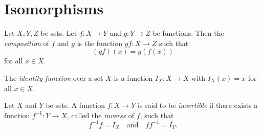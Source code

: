 \section{Isomorphisms}
\begin{definition}
  \label{def:composition}
  Let $X, Y, Z$ be sets.
  Let $f: X \to Y$ and $g: Y \to Z$ be functions.
  Then the \emph{composition} of $f$ and $g$ is the function $gf: X \to Z$ such
  that
  \begin{equation*}
    (gf)(x) = g(f(x))
  \end{equation*}
  for all $x \in X$.
\end{definition}

\begin{definition}
  \label{def:identity-function}
  The \emph{identity function} over a set $X$ is a function $I_X: X \to X$
  with $I_X(x) = x$ for all $x \in X$.
\end{definition}

\begin{definition}
  \label{def:invertibility}
  Let $X$ and $Y$ be sets.
  A function $f: X \to Y$ is said to be \emph{invertible} if there exists a
  function $f^{-1}: Y \to X$, called the \emph{inverse} of $f$, such that
  \begin{equation*}
    f^{-1}f = I_X
    \quad \text{and} \quad
    ff^{-1} = I_Y.
  \end{equation*}
\end{definition}

